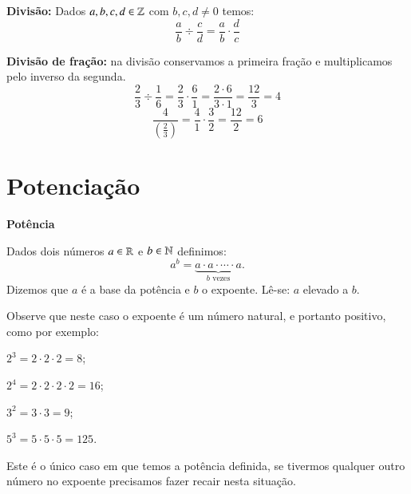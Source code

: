  \vskip0.3cm

 \colorbox{azul}{
 \begin{minipage}{0.9\linewidth}
 \begin{center}
  \textbf{Divisão:} Dados $a, b, c, d \in \mathbb{Z}$ com $b, c, d \neq 0$ temos:
 \[\frac{a}{b} \div \frac{c}{d}= \frac{a}{b} \cdot \frac{d}{c} \]
 \end{center}
 \end{minipage}}

 \vskip0.3cm
 \begin{exem}
  \textbf{Divisão de fração:} na divisão conservamos a primeira fração e multiplicamos pelo inverso da segunda.
   \[\frac{2}{3} \div \frac{1}{6}= \frac{2}{3} \cdot \frac{6}{1}= \frac{2 \cdot 6}{3 \cdot 1}= \frac{12}{3}= 4 \]
   \[\frac{4}{\left(\frac{2}{3}\right)}= \frac{4}{1} \cdot \frac{3}{2}= \frac{12}{2}=6\]
 \end{exem}


 \vskip0.3cm


 \section{Potenciação}

  \vskip0.3cm

 \textbf{Potência}

 \vskip0.3cm

 \colorbox{azul}{
 \begin{minipage}{0.9\linewidth}
 \begin{center}
  Dados dois números $a \in \mathbb{R}$ e $b \in \mathbb{N}$ definimos:
 \[a^b= \underbrace{a \cdot a \cdot \cdots \cdot a}_{b \text{ vezes}} .\]
  Dizemos que $a$ é a base da potência e $b$ o expoente. Lê-se: $a$ elevado a $b$.
 \end{center}
 \end{minipage}}

 \vskip0.3cm

 \begin{exem}
 Observe que neste caso o expoente é um número natural, e portanto positivo, como por exemplo:

  $2^3= 2 \cdot 2 \cdot 2= 8$;

  $2^4=2 \cdot 2 \cdot 2 \cdot  2= 16$;

  $3^2= 3 \cdot 3= 9$;

  $5^3= 5 \cdot 5 \cdot 5= 125$.

  Este é o único caso em que temos a potência definida, se tivermos qualquer outro número no expoente precisamos fazer recair nesta situação.
 \end{exem}


